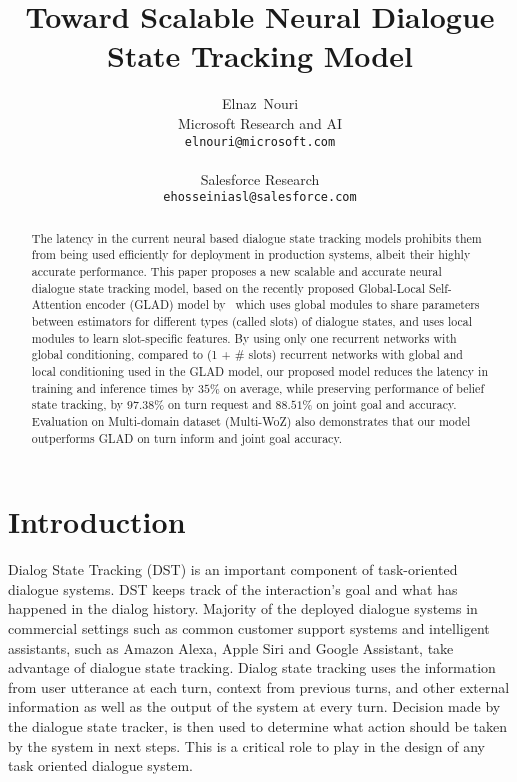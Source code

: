 \documentclass{article}
\title{Toward Scalable Neural Dialogue State Tracking Model}
\author{
Elnaz~Nouri\\
  Microsoft Research and AI\\
  \texttt{elnouri@microsoft.com} \\
  \And{Ehsan~Hosseini-Asl}\\
  Salesforce Research\\
  \texttt{ehosseiniasl@salesforce.com} 
}
\begin{document}
\maketitle

\begin{abstract}


The latency in the current neural based dialogue state tracking models prohibits them from being used efficiently for deployment in production systems, albeit their highly accurate performance. 
This paper proposes a new scalable and accurate neural dialogue state tracking model, based on the recently proposed Global-Local Self-Attention encoder (GLAD) model by~\cite{Zhong2018GlobalLocallySD} which uses global modules to share parameters between
estimators for different types (called slots) of dialogue states, and uses local modules to learn slot-specific features.
By using only one recurrent networks with global conditioning, compared to (1 + \# slots) recurrent networks with global and local conditioning used in the GLAD model, our proposed model reduces the latency in training and inference times by $35\%$ on average, while preserving performance of belief state tracking, by $97.38\%$ on turn request and $88.51\%$ on joint goal and accuracy. Evaluation on Multi-domain dataset (Multi-WoZ) also demonstrates that our model outperforms GLAD on turn inform and joint goal accuracy. 

\end{abstract}

\maketitle

\section{Introduction}

Dialog State Tracking (DST) is an important component of task-oriented dialogue systems. DST keeps track of the interaction's goal and what has happened in the dialog history. Majority of the deployed dialogue systems in commercial settings such as common customer support systems and intelligent assistants, such as Amazon Alexa, Apple Siri and Google Assistant, take advantage of dialogue state tracking. Dialog state tracking uses the information from user utterance at each turn, context from previous turns, and other external information as well as the output of the system at every turn. 
Decision made by the dialogue state tracker, is then used to determine what action should be taken by the system in next steps. This is a critical role to play in the design of any task oriented dialogue system.  
\end{document}
